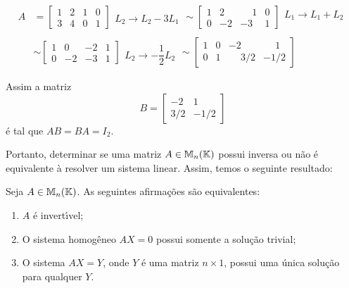 \begin{align*}
	A &= \left[
			\begin{array}{cc|cc}
		        1 & 2 & 1 & 0 \\
		        3 & 4 & 0 & 1
    		\end{array}
    	\right]
    	\begin{array}{l}
    	\\
        L_2 \to L_2 - 3L_1
    	\end{array} \sim
    \left[
    	\begin{array}{cc|cc}
    		1 &  2 & \phantom{-}1 & 0 \\
        	0 &  -2 & -3 & 1	
    	\end{array}
    \right]
    \begin{array}{l}
        L_1 \to L_1 + L_2\\
    \end{array}\\ \\ &\sim
    \left[
    	\begin{array}{cc|cc}
        	1 &  0 & -2 & 1 \\
        	0 &  -2 & -3 & 1
    	\end{array}
    \right]
    \begin{array}{l}
        \\
        L_2 \to -\dfrac{1}{2}L_2
    \end{array} \sim
    \left[
    	\begin{array}{cc|cc}
    		1 &  0 & -2 & \phantom{-}1 \\
        	0 &  1 & \phantom{-}3/2 & -1/2
    	\end{array}
    \right]
\end{align*}


Assim a matriz
\[
	B =
	\begin{bmatrix}
		-2 & 1 \\
		3/2 & -1/2
	\end{bmatrix}
\]
\'e tal que $AB = BA = I_2$.

Portanto, determinar se uma matriz $A \in \mathbb{M}_n(\mathbb{K})$ possui inversa ou n\~ao \'e equivalente \`a resolver um sistema linear. Assim, temos o seguinte resultado:
\begin{teorema}
	Seja $A \in \mathbb{M}_n(\mathbb{K})$. As seguintes afirma\c{c}\~oes s\~ao equivalentes:
	\begin{enumerate}[label={\roman*})]
		\item $A$ \'e invert{\'\i}vel;
		\item O sistema homog\^eneo $AX = 0$ possui somente a solu\c{c}\~ao trivial;
		\item O sistema $AX = Y$, onde $Y$ \'e uma matriz $n \times 1$, possui uma \'unica solu\c{c}\~ao para qualquer $Y$.
	\end{enumerate}
\end{teorema}


